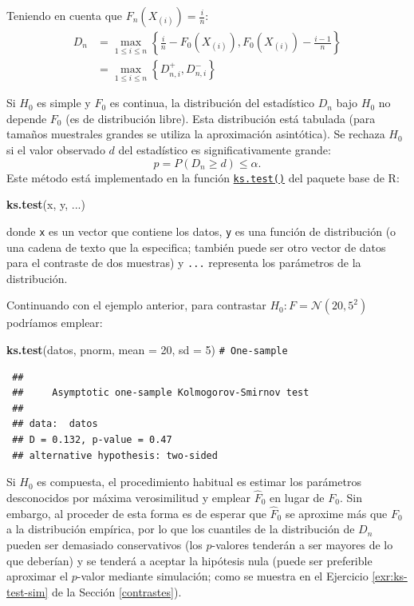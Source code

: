 \documentclass[
  spanish,
  10pt,
]{book}
\newenvironment{Shaded}{\begin{snugshade}}{\end{snugshade}}
\newcommand{\AttributeTok}[1]{\textcolor[rgb]{0.13,0.29,0.53}{#1}}
\newcommand{\CommentTok}[1]{\textcolor[rgb]{0.56,0.35,0.01}{\textit{#1}}}
\newcommand{\DecValTok}[1]{\textcolor[rgb]{0.00,0.00,0.81}{#1}}
\newcommand{\FunctionTok}[1]{\textcolor[rgb]{0.13,0.29,0.53}{\textbf{#1}}}
\newcommand{\NormalTok}[1]{#1}
\theoremstyle{break}
\theoremstyle{nonumberplain}
\renewcommand{\CommentTok}[1]{\textcolor[rgb]{0.41,0.41,0.41}{\texttt{#1}}}
\begin{document}
Teniendo en cuenta que \(F_n\left(  X_{(i)}\right) = \frac{i}n\):
\[\begin{aligned}
D_n  & =\max_{1\leq i\leq n}\left \{  \frac{i}n-F_0(X_{(i)}),F_0(X_{(i)})-\frac{i-1}n\right \} \\
& =\max_{1\leq i\leq n}\left \{  D_{n,i}^{+},D_{n,i}^{-}\right \}
\end{aligned}\]

Si \(H_0\) es simple y \(F_0\) es continua, la distribución del estadístico \(D_n\) bajo \(H_0\) no depende \(F_0\) (es de distribución libre).
Esta distribución está tabulada (para tamaños muestrales grandes se utiliza la aproximación asintótica).
Se rechaza \(H_0\) si el valor observado \(d\) del estadístico es significativamente grande:
\[p = P \left( D_n \geq d \right) \leq \alpha.\]
Este método está implementado en la función \href{https://rdrr.io/r/stats/ks.test.html}{\texttt{ks.test()}} del paquete base de R:

\begin{Shaded}
\begin{Highlighting}[]
\FunctionTok{ks.test}\NormalTok{(x, y, ...)}
\end{Highlighting}
\end{Shaded}

donde \texttt{x} es un vector que contiene los datos, \texttt{y} es una función de distribución
(o una cadena de texto que la especifica; también puede ser otro vector de datos
para el contraste de dos muestras) y \texttt{...} representa los parámetros de la distribución.

Continuando con el ejemplo anterior, para contrastar \(H_0:F= \mathcal{N}(20,5^2)\) podríamos emplear:

\begin{Shaded}
\begin{Highlighting}[]
\FunctionTok{ks.test}\NormalTok{(datos, pnorm, }\AttributeTok{mean =} \DecValTok{20}\NormalTok{, }\AttributeTok{sd =} \DecValTok{5}\NormalTok{) }\CommentTok{\# One{-}sample }
\end{Highlighting}
\end{Shaded}

\begin{verbatim}
 ## 
 ##     Asymptotic one-sample Kolmogorov-Smirnov test
 ## 
 ## data:  datos
 ## D = 0.132, p-value = 0.47
 ## alternative hypothesis: two-sided
\end{verbatim}

Si \(H_0\) es compuesta, el procedimiento habitual es estimar los parámetros desconocidos
por máxima verosimilitud y emplear \(\hat{F}_0\) en lugar de \(F_0\).
Sin embargo, al proceder de esta forma es de esperar que \(\hat{F}_0\) se aproxime más
que \(F_0\) a la distribución empírica, por lo que los cuantiles de la distribución de
\(D_n\) pueden ser demasiado conservativos (los \(p\)-valores tenderán a ser mayores de
lo que deberían) y se tenderá a aceptar la hipótesis nula (puede ser preferible aproximar el \(p\)-valor mediante simulación; como se muestra en el Ejercicio \ref{exr:ks-test-sim} de la Sección \ref{contrastes}).
\end{document}
